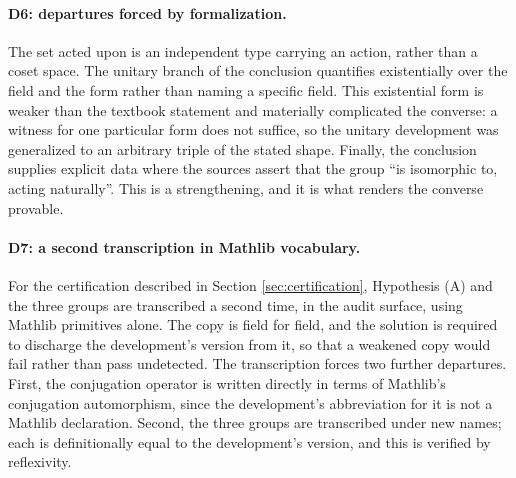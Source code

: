 \documentclass{article}
\begin{document}
\paragraph{D6: departures forced by formalization.}
The set acted upon is an independent type carrying an action, rather than a coset
space. The unitary branch of the conclusion quantifies existentially over the
field and the form rather than naming a specific field. This existential form is
weaker than the textbook statement and materially complicated the converse: a
witness for one particular form does not suffice, so the unitary development was
generalized to an arbitrary triple of the stated shape. Finally, the conclusion
supplies explicit data where the sources assert that the group ``is isomorphic
to, acting naturally''. This is a strengthening, and it is what renders the
converse provable.

\paragraph{D7: a second transcription in Mathlib vocabulary.}
For the certification described in Section \ref{sec:certification}, Hypothesis
(A) and the three groups are transcribed a second time, in the audit surface,
using Mathlib primitives alone. The copy is field for field, and the solution is
required to discharge the development's version from it, so that a weakened copy
would fail rather than pass undetected. The transcription forces two further
departures. First, the conjugation operator is written directly in terms of
Mathlib's conjugation automorphism, since the development's abbreviation for it
is not a Mathlib declaration. Second, the three groups are transcribed under new
names; each is definitionally equal to the development's version, and this is
verified by reflexivity.
\end{document}
